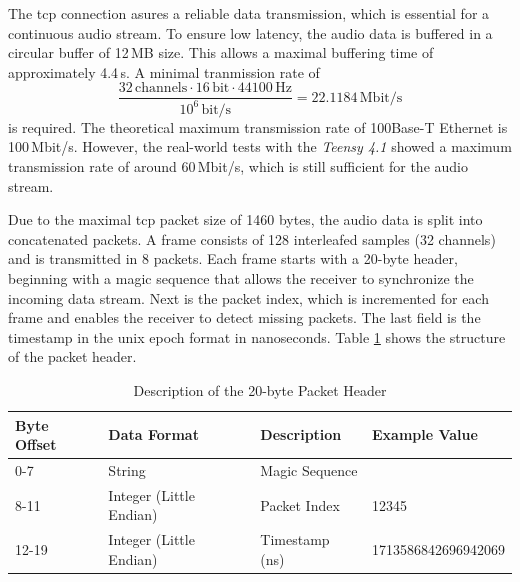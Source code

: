 The \acrshort{tcp} connection asures a reliable data transmission, which is essential for a continuous audio stream.
To ensure low latency, the audio data is buffered in a circular buffer of 12\,MB size.
This allows a maximal buffering time of approximately 4.4\,s.
A minimal tranmission rate of
\begin{equation}
	\frac{32\,\text{channels} \cdot 16\,\text{bit} \cdot 44100\,\text{Hz}}{10^6\,\text{bit/s}} = 22.1184\,\text{Mbit/s}
\end{equation}
is required.
The theoretical maximum transmission rate of 100Base-T Ethernet is 100\,Mbit/s.
However, the real-world tests with the \textit{Teensy 4.1} showed a maximum transmission rate of around 60\,Mbit/s, which is still sufficient for the audio stream.

\newpage
Due to the maximal \acrshort{tcp} packet size of 1460 bytes, the audio data is split into concatenated packets.
A frame consists of 128 interleafed samples (32 channels) and is transmitted in 8 packets.
Each frame starts with a 20-byte header, beginning with a magic sequence that allows the receiver to synchronize the incoming data stream.
Next is the packet index, which is incremented for each frame and enables the receiver to detect missing packets.
The last field is the timestamp in the \acrshort{unix} epoch format in nanoseconds.
Table \ref{tab:packet_header} shows the structure of the packet header.
\begin{table}[h!]
	\centering
	\begin{tabular}{|l|l|l|l|}
		\hline
		\textbf{Byte Offset} & \textbf{Data Format}    & \textbf{Description} & \textbf{Example Value} \\ \hline
		0-7                  & String                  & Magic Sequence       & \codeword{HERON666}    \\ \hline
		8-11                 & Integer (Little Endian) & Packet Index         & 12345                  \\ \hline
		12-19                & Integer (Little Endian) & Timestamp (ns)       & 1713586842696942069    \\ \hline
	\end{tabular}
	\caption{Description of the 20-byte Packet Header}
	\label{tab:packet_header}
\end{table}

